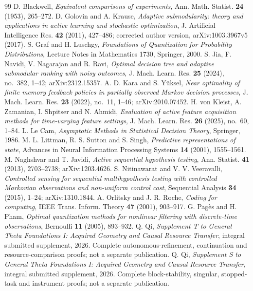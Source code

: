 \enlargethispage{2\baselineskip}
\begin{thebibliography}{99}
 D. Blackwell, \emph{Equivalent comparisons of experiments}, Ann. Math. Statist. \textbf{24} (1953), 265--272.
 D. Golovin and A. Krause, \emph{Adaptive submodularity: theory and applications in active learning and stochastic optimization}, J. Artificial Intelligence Res. \textbf{42} (2011), 427--486; corrected author version, arXiv:1003.3967v5 (2017).
 S. Graf and H. Luschgy, \emph{Foundations of Quantization for Probability Distributions}, Lecture Notes in Mathematics 1730, Springer, 2000.
 S. Jia, F. Navidi, V. Nagarajan and R. Ravi, \emph{Optimal decision tree and adaptive submodular ranking with noisy outcomes}, J. Mach. Learn. Res. \textbf{25} (2024), no.~382, 1--42; arXiv:2312.15357.
 A. D. Kara and S. Y\"uksel, \emph{Near optimality of finite memory feedback policies in partially observed Markov decision processes}, J. Mach. Learn. Res. \textbf{23} (2022), no.~11, 1--46; arXiv:2010.07452.
 H. von Kleist, A. Zamanian, I. Shpitser and N. Ahmidi, \emph{Evaluation of active feature acquisition methods for time-varying feature settings}, J. Mach. Learn. Res. \textbf{26} (2025), no.~60, 1--84.
 L. Le Cam, \emph{Asymptotic Methods in Statistical Decision Theory}, Springer, 1986.
 M. L. Littman, R. S. Sutton and S. Singh, \emph{Predictive representations of state}, Advances in Neural Information Processing Systems \textbf{14} (2001), 1555--1561.
 M. Naghshvar and T. Javidi, \emph{Active sequential hypothesis testing}, Ann. Statist. \textbf{41} (2013), 2703--2738; arXiv:1203.4626.
 S. Nitinawarat and V. V. Veeravalli, \emph{Controlled sensing for sequential multihypothesis testing with controlled Markovian observations and non-uniform control cost}, Sequential Analysis \textbf{34} (2015), 1--24; arXiv:1310.1844.
 A. Orlitsky and J. R. Roche, \emph{Coding for computing}, IEEE Trans. Inform. Theory \textbf{47} (2001), 903--917.
 G. Pag\`es and H. Pham, \emph{Optimal quantization methods for nonlinear filtering with discrete-time observations}, Bernoulli \textbf{11} (2005), 893--932.
 Q. Qi, \emph{Supplement T to General Theta Foundations I: Acquired Geometry and Causal Resource Transfer}, integral submitted supplement, 2026. Complete autonomous-refinement, continuation and resource-comparison proofs; not a separate publication.
 Q. Qi, \emph{Supplement S to General Theta Foundations I: Acquired Geometry and Causal Resource Transfer}, integral submitted supplement, 2026. Complete block-stability, singular, stopped-task and instrument proofs; not a separate publication.

\end{thebibliography}

